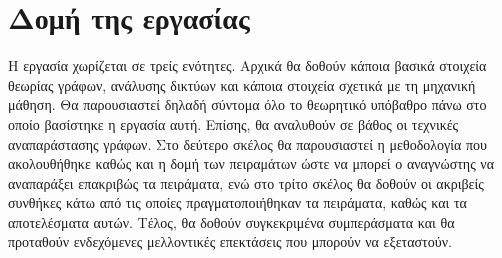 \section{Δομή της εργασίας}

Η εργασία χωρίζεται σε τρείς ενότητες. Αρχικά θα δοθούν κάποια βασικά στοιχεία θεωρίας γράφων, ανάλυσης
δικτύων και κάποια στοιχεία σχετικά με τη μηχανική μάθηση. Θα παρουσιαστεί δηλαδή σύντομα όλο το θεωρητικό υπόβαθρο
πάνω στο οποίο βασίστηκε η εργασία αυτή. Επίσης, θα αναλυθούν σε βάθος οι τεχνικές αναπαράστασης 
γράφων. Στο δεύτερο σκέλος θα παρουσιαστεί η μεθοδολογία που ακολουθήθηκε καθώς και η δομή των πειραμάτων
ώστε να μπορεί ο αναγνώστης να αναπαράξει επακριβώς τα πειράματα,
ενώ στο τρίτο σκέλος θα δοθούν οι ακριβείς συνθήκες κάτω από τις οποίες πραγματοποιήθηκαν τα πειράματα,
καθώς και τα αποτελέσματα αυτών. Τέλος, θα δοθούν συγκεκριμένα συμπεράσματα και θα προταθούν 
ενδεχόμενες μελλοντικές επεκτάσεις που μπορούν να εξεταστούν.